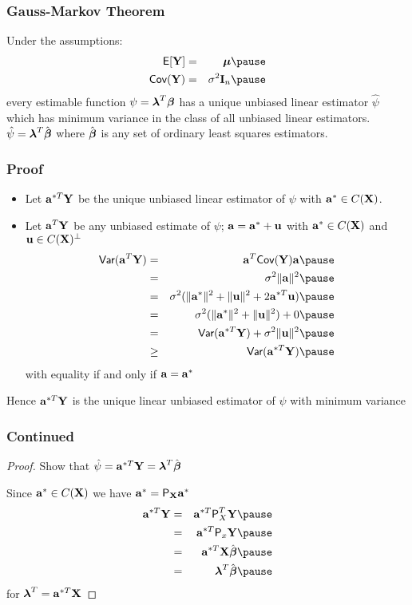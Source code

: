 \documentclass[handout]{beamer}
\begin{document}
\begin{frame}
  \frametitle{Gauss-Markov Theorem}
  \begin{theorem}

  Under the assumptions:
  \begin{eqnarray*}
    \E[\Y] & = & \mub \pause \\
    \Cov(\Y) & = &\sigma^2 \I_n \pause
  \end{eqnarray*}
every estimable function $\psi = \boldsymbol{\lambda}^T\boldsymbol{\beta}$ has a unique unbiased
linear estimator $\hat{\psi}$ which has minimum variance in the class
of all unbiased linear estimators. \pause  $\hat{\psi} = \boldsymbol{\lambda}^T\hat{\boldsymbol{\beta}}$
where $\hat{\boldsymbol{\beta}}$ is any set of ordinary least squares
estimators.
    
  \end{theorem}
\end{frame}
\begin{frame} \frametitle{Proof}
 \begin{block}{}
   \begin{itemize}
    \item
    Let $\mathbf{a}^{*T}\mathbf{Y}$ be the unique unbiased linear estimator of $\psi$
    with $\mathbf{a}^* \in C(\mathbf{X})$. \pause
\item Let $\mathbf{a}^T\mathbf{Y}$ be any unbiased estimate of $\psi$; $\mathbf{a} = \mathbf{a}^* +
  \mathbf{u}$ with $\mathbf{a}^* \in C(\mathbf{X})$ and $\mathbf{u} \in C(\mathbf{X})^\perp$ \pause
  \begin{eqnarray*}
    \Var(\a^T\Y) & = & \a^T\Cov(\Y)\a  \pause\\
 & = & \sigma^2 \| \a \|^2  \pause \\
& = & \sigma^2 (\| \a^* \|^2 + \|\u\|^2 + 2 \a^{*T} \u) \pause\\
& = & \sigma^2 (\| \a^* \|^2 + \|\u\|^2) + 0 \pause\\
& = & \Var(\a^{*T}\Y) + \sigma^2 \|\u\|^2 \pause \\
& \geq & \Var(\a^{*T}\Y) \pause
  \end{eqnarray*}
with equality if and only if $\mathbf{a} = \mathbf{a}^*$ \pause
\end{itemize}
Hence $\mathbf{a}^{*T}\mathbf{Y}$ is the unique linear unbiased estimator of $\psi$
with minimum variance 
  \end{block}
\end{frame}
\begin{frame}
  \frametitle{Continued}
  \begin{proof}
  Show that $\hat{\psi} = \mathbf{a}^{*T}\mathbf{Y} = \boldsymbol{\lambda}^T\hat{\boldsymbol{\beta}}$ \pause

  Since $\mathbf{a}^* \in C(\mathbf{X})$ we have $\mathbf{a}^*  =  \textsf{P}_{\mathbf{X}} \mathbf{a}^*$  \pause
    \begin{eqnarray*}
\a^{*T}\Y & = &  \a^{*T} \P_X^T \Y \pause \\
         & = & \a^{*T}\P_x\Y \pause \\
         & = & \a^{*T} \X \bhat \pause \\
         & = & \lambdab^T \bhat  \pause
    \end{eqnarray*}
for $\boldsymbol{\lambda}^T = \mathbf{a}^{*T}\mathbf{X}$
  \end{proof}
\end{frame}
\end{document}
